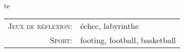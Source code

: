 te
\begin{tabular}{rl}
    \textsc{Jeux de réflexion:} & échec, labyrinthe \\
   \textsc{Sport:} & footing, football, basketball \\
\end{tabular}